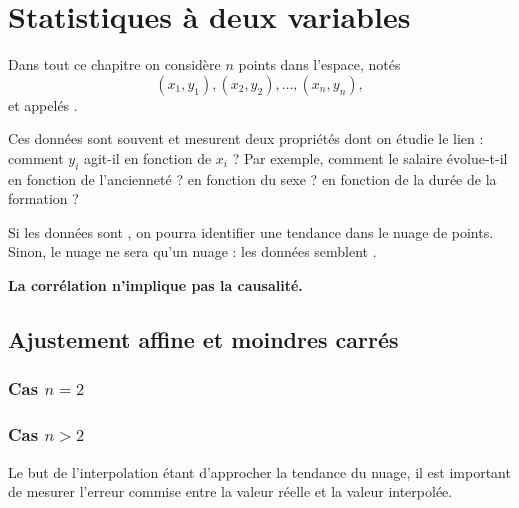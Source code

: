 
\chapter{Statistiques à deux variables}

Dans tout ce chapitre on considère $n$ points dans l'espace, notés 
	\[ (x_1, y_1), (x_2, y_2), \dots, (x_n, y_n), \]
et appelés .

Ces données sont souvent  et mesurent deux propriétés dont on étudie le lien : comment $y_i$ agit-il en fonction de $x_i$ ?
Par exemple, comment le salaire évolue-t-il en fonction de l'ancienneté ? en fonction du sexe ? en fonction de la durée de la formation ?

Si les données sont , on pourra identifier une tendance dans le nuage de points.
Sinon, le nuage ne sera qu'un nuage : les données semblent .

\textbf{\warning La corrélation n'implique pas la causalité.}

\section{Ajustement affine et moindres carrés}


\subsection{Cas $n=2$}


\subsection{Cas $n>2$}


Le but de l'interpolation étant d'approcher la tendance du nuage, il est important de mesurer l'erreur commise entre la valeur réelle et la valeur interpolée.



